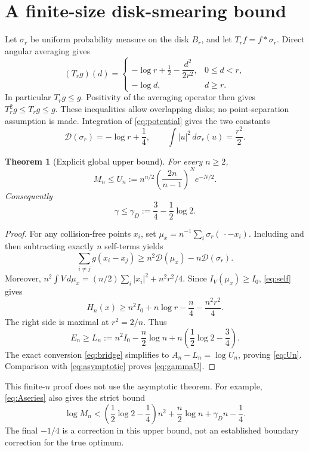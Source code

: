 \documentclass[11pt,a4paper]{article}
\newtheorem{theorem}{Theorem}[section]
\theoremstyle{remark}
\newcommand{\dd}{\,d}
\newcommand{\D}{\mathcal D}
\numberwithin{equation}{section}
\begin{document}
\section{A finite-size disk-smearing bound}
Let \(\sigma_r\) be uniform probability measure on the disk \(B_r\),
and let \(T_rf=f*\sigma_r\). Direct angular averaging gives
\begin{equation}\label{eq:potential}
 (T_rg)(d)=
 \begin{cases}
 -\log r+\frac12-\dfrac{d^2}{2r^2},&0\le d<r,\\
 -\log d,&d\ge r.
 \end{cases}
\end{equation}
In particular \(T_rg\le g\). Positivity of the averaging operator then
gives \(T_r^2g\le T_rg\le g\). These inequalities allow overlapping
disks; no point-separation assumption is made.
Integration of \eqref{eq:potential} gives the two constants
\begin{equation}\label{eq:self}
 \D(\sigma_r)=-\log r+\frac14,\qquad
 \int|u|^2\dd\sigma_r(u)=\frac{r^2}{2}.
\end{equation}

\begin{theorem}[Explicit global upper bound]\label{thm:finite}
For every \(n\ge2\),
\begin{equation}\label{eq:Un}
 M_n\le U_n:=
 n^{n/2}\left(\frac{2n}{n-1}\right)^N e^{-N/2}.
\end{equation}
Consequently
\begin{equation}\label{eq:gammaU}
 \gamma\le\gamma_D:=\frac34-\frac12\log2.
\end{equation}
\end{theorem}
\begin{proof}
For any collision-free points \(x_i\), set
\(\mu_x=n^{-1}\sum_i\sigma_r(\,\cdot-x_i)\).
Including and then subtracting exactly \(n\) self-terms yields
\[
 \sum_{i\ne j}g(x_i-x_j)
 \ge n^2\D(\mu_x)-n\D(\sigma_r).
\]
Moreover,
\(n^2\int V\dd\mu_x=(n/2)\sum_i|x_i|^2+n^2r^2/4\).
Since \(I_V(\mu_x)\ge I_0\), \eqref{eq:self} gives
\[
 H_n(x)\ge n^2I_0+n\log r-\frac n4-\frac{n^2r^2}{4}.
\]
The right side is maximal at \(r^2=2/n\). Thus
\begin{equation}\label{eq:Ln}
 E_n\ge L_n:=
 n^2I_0-\frac n2\log n
           +n\left(\frac12\log2-\frac34\right).
\end{equation}
The exact conversion \eqref{eq:bridge} simplifies to
\(A_n-L_n=\log U_n\), proving \eqref{eq:Un}.
Comparison with \eqref{eq:asymptotic} proves \eqref{eq:gammaU}.
\end{proof}
This finite-\(n\) proof does not use the asymptotic theorem.
For example, \eqref{eq:Aseries} also gives the strict bound
\[
 \log M_n<
 \left(\frac12\log2-\frac14\right)n^2+\frac n2\log n
                    +\gamma_Dn-\frac14.
\]
The final \(-1/4\) is a correction in this upper bound, not an established
boundary correction for the true optimum.
\end{document}

